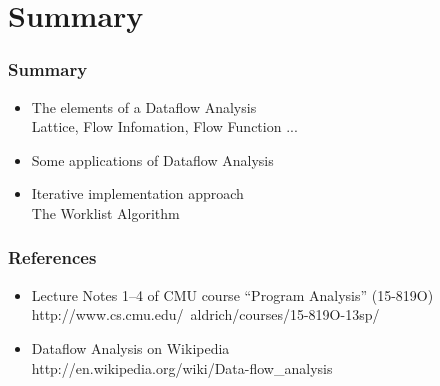 \documentclass[]{beamer}
\begin{document}



\section{Summary}
\frame{\tableofcontents[currentsection]}

\begin{frame}
  \frametitle{Summary}
  \begin{itemize}
    \item The elements of a Dataflow Analysis\\
      Lattice, Flow Infomation, Flow Function ...
    \item Some applications of Dataflow Analysis
    \item Iterative implementation approach\\
      The Worklist Algorithm
  \end{itemize}
\end{frame}

\begin{frame}
  \frametitle{References}
  \begin{itemize}
    \item Lecture Notes 1--4 of CMU course ``Program Analysis'' (15-819O)\\
      http://www.cs.cmu.edu/~aldrich/courses/15-819O-13sp/
    \item Dataflow Analysis on Wikipedia\\
      http://en.wikipedia.org/wiki/Data-flow\_analysis
  \end{itemize}
\end{frame}

\end{document}
